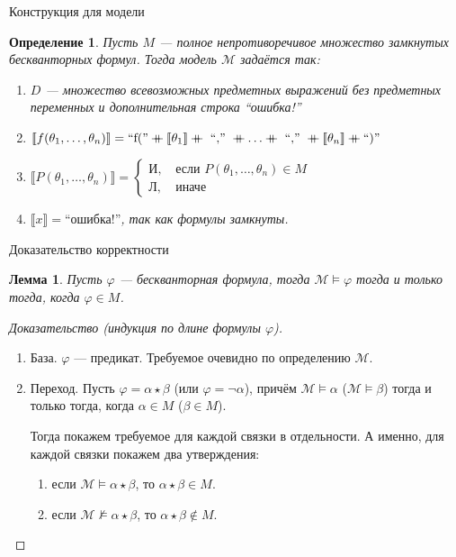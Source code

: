 \documentclass[aspectratio=169]{beamer}
\newtheorem{dfn}{Определение}[section]
\newtheorem{lmm}{Лемма}[section]
\begin{document}
\begin{frame}{Конструкция для модели}
\begin{dfn}
Пусть $M$ --- полное непротиворечивое множество замкнутых бескванторных формул. Тогда
модель $\mathcal{M}$ задаётся так:\pause
\begin{enumerate}
\item $D$ --- множество всевозможных предметных выражений без предметных переменных и дополнительная строка ``ошибка!''\pause
\item $\llbracket f(\theta_1,\dots,\theta_n) \rrbracket = \mbox{``f(''} \mdoubleplus \llbracket\theta_1\rrbracket \mdoubleplus \mbox{ ``,'' }
    \mdoubleplus \dots \mdoubleplus \mbox{ ``,'' } \mdoubleplus \llbracket\theta_n\rrbracket \mdoubleplus \mbox {``)'' } $\pause
\item $\llbracket P(\theta_1,\dots,\theta_n)\rrbracket = \left\{
  \begin{array}{ll} \mbox{И}, &\mbox{ если } P(\theta_1,\dots,\theta_n) \in M\\
                   \mbox{Л}, &\mbox{ иначе}\end{array}\right.$\pause
\item $\llbracket x \rrbracket = \mbox{``ошибка!''}$, так как формулы замкнуты.
\end{enumerate}
\end{dfn}
\end{frame}

\begin{frame}{Доказательство корректности}
\begin{lmm}Пусть $\varphi$ --- бескванторная формула, тогда $\mathcal{M}\models\varphi$ тогда и только тогда, когда $\varphi\in M$.
\end{lmm}\pause

\begin{proof}[Доказательство (индукция по длине формулы $\varphi$)]
\begin{enumerate}
\item База. $\varphi$ --- предикат. Требуемое очевидно по определению $\mathcal{M}$.\pause
\item Переход. Пусть $\varphi = \alpha\star\beta$ (или $\varphi=\neg\alpha$), причём $\mathcal{M}\models\alpha$ ($\mathcal{M}\models\beta$)
   тогда и только тогда, когда $\alpha\in M$ ($\beta\in M$).\pause

Тогда покажем требуемое для каждой связки в отдельности. А именно, для каждой связки покажем два утверждения:
\begin{enumerate}
\item если $\mathcal{M}\models\alpha\star\beta$, то $\alpha\star\beta \in M$.

\item если $\mathcal{M}\not\models\alpha\star\beta$, то $\alpha\star\beta \notin M$.
\end{enumerate}
\end{enumerate}
\end{proof}
\end{frame}
\end{document}
